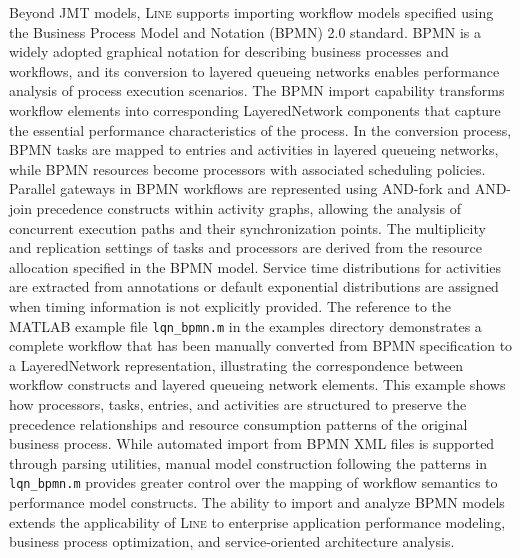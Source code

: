 Beyond JMT models, \textsc{Line} supports importing workflow models specified using the Business Process Model and Notation (BPMN) 2.0 standard. BPMN is a widely adopted graphical notation for describing business processes and workflows, and its conversion to layered queueing networks enables performance analysis of process execution scenarios. The BPMN import capability transforms workflow elements into corresponding LayeredNetwork components that capture the essential performance characteristics of the process. In the conversion process, BPMN tasks are mapped to entries and activities in layered queueing networks, while BPMN resources become processors with associated scheduling policies. Parallel gateways in BPMN workflows are represented using AND-fork and AND-join precedence constructs within activity graphs, allowing the analysis of concurrent execution paths and their synchronization points. The multiplicity and replication settings of tasks and processors are derived from the resource allocation specified in the BPMN model. Service time distributions for activities are extracted from annotations or default exponential distributions are assigned when timing information is not explicitly provided. The reference to the MATLAB example file \texttt{lqn\_bpmn.m} in the examples directory demonstrates a complete workflow that has been manually converted from BPMN specification to a LayeredNetwork representation, illustrating the correspondence between workflow constructs and layered queueing network elements. This example shows how processors, tasks, entries, and activities are structured to preserve the precedence relationships and resource consumption patterns of the original business process. While automated import from BPMN XML files is supported through parsing utilities, manual model construction following the patterns in \texttt{lqn\_bpmn.m} provides greater control over the mapping of workflow semantics to performance model constructs. The ability to import and analyze BPMN models extends the applicability of \textsc{Line} to enterprise application performance modeling, business process optimization, and service-oriented architecture analysis.


